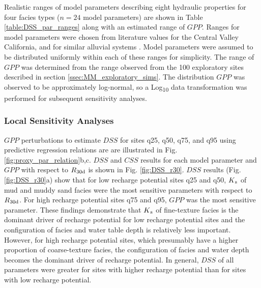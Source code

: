 Realistic ranges of model parameters describing eight hydraulic properties for four facies types ($n = 24$ model parameters) are shown in Table \ref{table:DSS_par_ranges} along with an estimated range of $GPP$. Ranges for model parameters were chosen from literature values for the Central Valley California, and for similar alluvial systems \citep{anderson2015applied,botros2009spatial,fleckenstein2004managing,frei2009patterns,maserjian1993hydrogeologic,niswonger2008influence,sager2012effects}. Model parameters were assumed to be distributed uniformly within each of these ranges for simplicity. The range of $GPP$ was determined from the range observed from the 100 exploratory sites described in section \ref{ssec:MM_exploratory_sims}. The distribution $GPP$ was observed to be approximately log-normal, so a Log\textsubscript{10} data transformation was performed for subsequent sensitivity analyses. 



\subsubsection{Local Sensitivity Analyses} \label{sssec:R_local_sensitivity}
$GPP$ perturbations to estimate $DSS$ for sites q25, q50, q75, and q95 using predictive regression relations are are illustrated in Fig. \ref{fig:proxy_par_relation}b,c. $DSS$ and $CSS$ results for each model parameter and $GPP$ with respect to $R\textsubscript{30d}$ is shown in Fig. \ref{fig:DSS_r30}. $DSS$ results (Fig. \ref{fig:DSS_r30}a) show that for low recharge potential sites q25 and q50, $K\textsubscript{s}$ of mud and muddy sand facies were the most sensitive parameters with respect to $R\textsubscript{30d}$. For high recharge potential sites q75 and q95, $GPP$ was the most sensitive parameter. These findings demonstrate that $K\textsubscript{s}$ of fine-texture facies is the dominant driver of recharge potential for low recharge potential sites and the configuration of facies and water table depth is relatively less important. However, for high recharge potential sites, which presumably have a higher proportion of coarse-texture facies, the configuration of facies and water depth becomes the dominant driver of recharge potential. In general, $DSS$ of all parameters were  greater for sites with higher recharge potential than for sites with low recharge potential.

